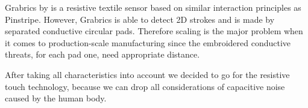 Grabrics by \cite{hamdan} is a resistive textile sensor based on similar interaction principles as Pinstripe. However, Grabrics is able to detect 2D strokes and is made by separated conductive circular pads. Therefore scaling is the major problem when it comes to production-scale manufacturing since the embroidered conductive threats,  for each pad one, need appropriate distance.  

After taking all characteristics into account we decided to go for the resistive touch technology, because we can drop all considerations of capacitive noise caused by the human body. 